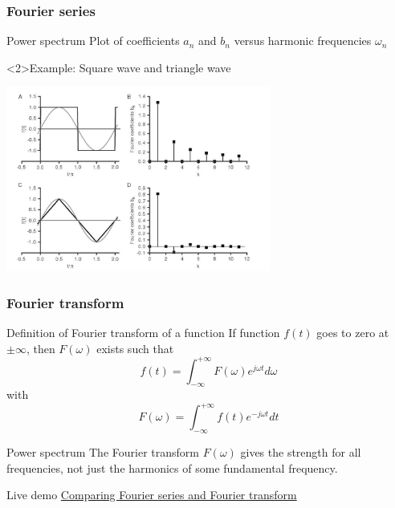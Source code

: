 \documentclass[beamer]{standalone}
\begin{document}
\begin{frame}[t]
 \frametitle{Fourier series}
 \begin{block}{Power spectrum}
  Plot of coefficients $a_n$ and $b_n$ versus harmonic frequencies $\omega_n$
 \end{block}
 \begin{block}<2>{Example: Square wave and triangle wave}
  \begin{center}
   \includegraphics[width=0.65\textwidth]{pics/square_wave_b_n}
  \end{center}
 \end{block}
\end{frame}

\begin{frame}
 \frametitle{Fourier transform}
 \begin{block}{Definition of Fourier transform of a function}
  If function $f(t)$ goes to \alert{zero at $\pm \infty$}, then $F(\omega)$ exists such that
  \[ f(t) = \int^{+\infty}_{-\infty} F(\omega) e^{j \omega t} d\omega \]
  with
  \[ F(\omega) = \int^{+\infty}_{-\infty} f(t) e^{-j \omega t} dt \]
 \end{block}
 \begin{block}{Power spectrum}
  The Fourier transform $F(\omega)$ gives the strength \alert{for all frequencies}, not just the harmonics of some fundamental frequency.
 \end{block}
 \begin{block}{Live demo}
  \href{http://demonstrations.wolfram.com/ComparingFourierSeriesAndFourierTransform/}{Comparing Fourier series and Fourier transform}
 \end{block}
\end{frame}
\end{document}
